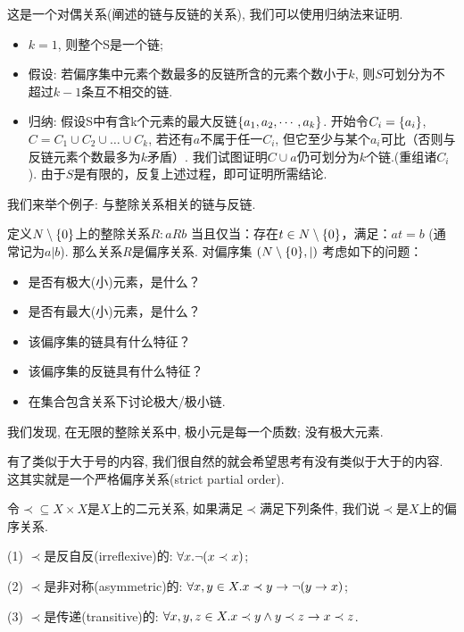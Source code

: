 这是一个对偶关系(阐述的链与反链的关系), 我们可以使用归纳法来证明. 

\begin{itemize}
	\item $k=1$, 则整个S是一个链;
	\item 假设: 若偏序集中元素个数最多的反链所含的元素个数小于$k$, 则$S$可划分为不超过$k-1$条互不相交的链.
	\item 归纳: 假设S中有含k个元素的最大反链$\{a_1, a_2, \cdots, a_k\}$. 开始令$C_i=\{a_i\}$, $C=C_1\cup C_2\cup …\cup C_k$, 若还有$a$不属于任一$C_i$, 但它至少与某个$a_i$可比（否则与反链元素个数最多为$k$矛盾）. 我们试图证明$C\cup {a}$仍可划分为$k$个链.(重组诸$C_i$). 由于$S$是有限的，反复上述过程，即可证明所需结论. 
\end{itemize}





我们来举个例子: 与整除关系相关的链与反链. 



\begin{example}
	定义$N\setminus\{0\}$上的整除关系$R: aRb$ 当且仅当：存在$t\in N\setminus\{0\}$，满足：$at=b$ (通常记为$a|b$). 那么关系$R$是偏序关系. 对偏序集 $(N\setminus\{0\}, | )$ 考虑如下的问题：
	
	\begin{itemize}
		\item 是否有极大(小)元素，是什么？
		\item 是否有最大(小)元素，是什么？
		\item 该偏序集的链具有什么特征？
		\item 该偏序集的反链具有什么特征？
		\item 在集合包含关系下讨论极大/极小链.
	\end{itemize}
	
	
\end{example}

我们发现, 在无限的整除关系中, 极小元是每一个质数; 没有极大元素. 


有了类似于大于号的内容, 我们很自然的就会希望思考有没有类似于大于的内容. 这其实就是一个严格偏序关系(strict partial order). 

\begin{definition}[严格偏序关系]
令$\prec\subseteq X\times X$是$X$上的二元关系, 如果满足$\prec$满足下列条件, 我们说$\prec$是$X$上的偏序关系.
 
	(1) $\prec$是反自反(irreflexive)的: $\forall x. \lnot (x\prec x)$;
	
	(2) $\prec$是非对称(asymmetric)的: $\forall x, y\in X. x\prec y\to \lnot (y\to x)$;
	
	(3) $\prec$是传递(transitive)的: $\forall x,y,z\in X. x\prec y \land y\prec z\to x\prec z$.

\end{definition}

